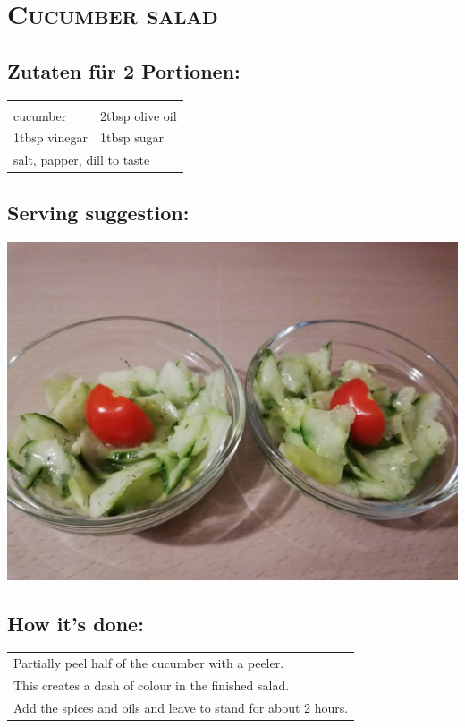 \section{\textsc{Cucumber salad}}

\subsection*{Zutaten für 2 Portionen:}

\begin{tabular}{p{7.5cm} p{7.5cm}}
	& \\
	\sfrac{1}{2} cucumber & 2tbsp olive oil \\
	1tbsp vinegar & 1tbsp sugar \\
	\multicolumn{2}{l}{salt, papper, dill to taste}
\end{tabular}

\subsection*{Serving suggestion:}

\includegraphics[width=\textwidth]{img/gurkensalat/gurkensalat_fertig.jpg} \cite{gurkensalat}

\subsection*{How it's done:}

\begin{tabular}{p{15cm}}
	\\
  Partially peel half of the cucumber with a peeler.\\
  This creates a dash of colour in the finished salad.\\
  Add the spices and oils and leave to stand for about 2 hours.
\end{tabular}
